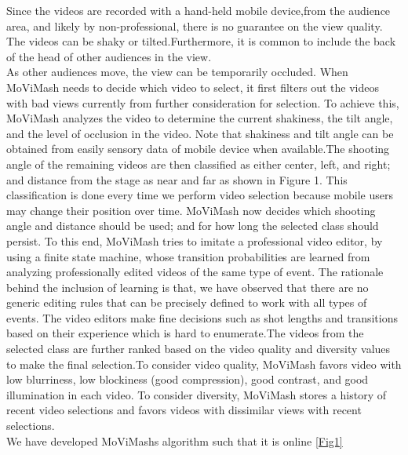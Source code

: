 \documentclass{IEEEtran}
\begin{document}
Since the videos are recorded with a hand-held mobile device,from the audience area, and likely by non-professional, there is no guarantee on the view quality. The videos can be shaky or tilted.Furthermore, it is common to include the back of the head of other
audiences in the view.\\
\qquad As other audiences move, the view can be temporarily occluded. When MoViMash needs to decide which video to select, it first filters out the videos with bad views currently from further consideration for selection. To achieve this, MoViMash analyzes the video to determine the current shakiness, the tilt angle, and the level of occlusion in the video. Note that shakiness and tilt angle can be obtained from easily sensory data of mobile
device when available.The shooting angle of the remaining videos are then classified as
either center, left, and right; and distance from the stage as near and far as shown in Figure 1. This classification is done every time we perform video selection because mobile users may change their position over time. MoViMash now decides which shooting angle and distance should be used; and for how long the selected class should persist. To this end, MoViMash tries to imitate a professional video editor, by using a finite state machine, whose transition probabilities are learned from analyzing professionally edited videos of the same type of event. The rationale behind the inclusion of learning is that, we have observed that there are no generic editing rules that can be precisely defined to work with all types of events. The
video editors make fine decisions such as shot lengths and transitions based on their experience which is hard to enumerate.The videos from the selected class are further ranked based on the video quality and diversity values to make the final selection.To consider video quality, MoViMash favors video with low blurriness, low blockiness (good compression), good contrast, and good illumination in each video. To consider diversity, MoViMash stores a history of recent video selections and favors videos with dissimilar views with recent selections.\\
\qquad We have developed MoViMash\textquotesingle s algorithm such that it is online \ref{Fig1}
\end{document}
